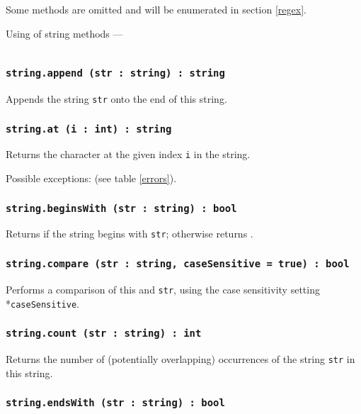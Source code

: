 Some methods are omitted and will be enumerated in section \ref{regex}.

\newpage
Using of string methods —
\inputminted[linenos]{icl}{../sources/stringmethods.icL}

\subsubsection{\texttt{string.append (str : string) : string}}

Appends the string \texttt{str} onto the end of this string.

\subsubsection{\texttt{string.at (i : int) : string}}

Returns the character at the given index \texttt{i} in the string.

Possible exceptions:  (see table \ref{errors}).

\subsubsection{\texttt{string.beginsWith (str : string) : bool}}

Returns \true{} if the string begins with \texttt{str}; otherwise returns \false.

\subsubsection{\texttt{string.compare (str : string, caseSensitive = true) : bool}}

Performs a comparison of this and \texttt{str}, using the case sensitivity setting \\*\texttt{caseSensitive}.

\subsubsection{\texttt{string.count (str : string) : int}}

Returns the number of (potentially overlapping) occurrences of the string \texttt{str} in this string.

\subsubsection{\texttt{string.endsWith (str : string) : bool}}

